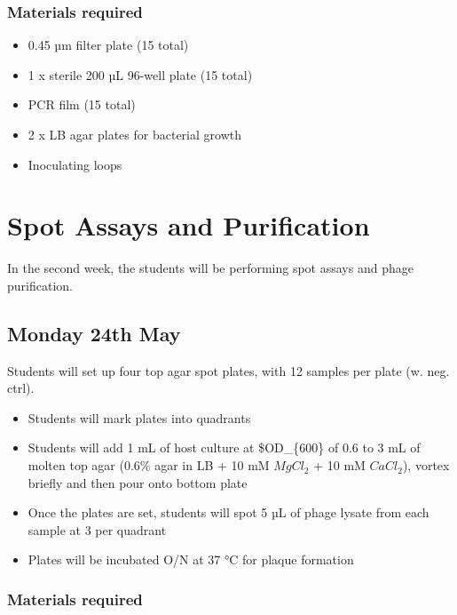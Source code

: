 \documentclass[
]{book}
\providecommand{\tightlist}{%
  \setlength{\itemsep}{0pt}\setlength{\parskip}{0pt}}
\begin{document}
\hypertarget{materials-required-4}{%
\subsection{Materials required}\label{materials-required-4}}

\begin{itemize}
\tightlist
\item
  0.45 µm filter plate (15 total)
\item
  1 x sterile 200 µL 96-well plate (15 total)
\item
  PCR film (15 total)
\item
  2 x LB agar plates for bacterial growth
\item
  Inoculating loops
\end{itemize}

\hypertarget{spot-assays-and-purification}{%
\chapter{Spot Assays and Purification}\label{spot-assays-and-purification}}

In the second week, the students will be performing spot assays and phage purification.

\hypertarget{monday-24th-may}{%
\section{Monday 24th May}\label{monday-24th-may}}

Students will set up four top agar spot plates, with 12 samples per plate (w. neg. ctrl).

\begin{itemize}
\tightlist
\item
  Students will mark plates into quadrants
\item
  Students will add 1 mL of host culture at \$OD\_\{600\} of 0.6 to 3 mL of molten top agar (0.6\% agar in LB + 10 mM \(MgCl_{2}\) + 10 mM \(CaCl_{2}\)), vortex briefly and then pour onto bottom plate
\item
  Once the plates are set, students will spot 5 µL of phage lysate from each sample at 3 per quadrant
\item
  Plates will be incubated O/N at 37 °C for plaque formation
\end{itemize}

\hypertarget{materials-required-5}{%
\subsection{Materials required}\label{materials-required-5}}
\end{document}
